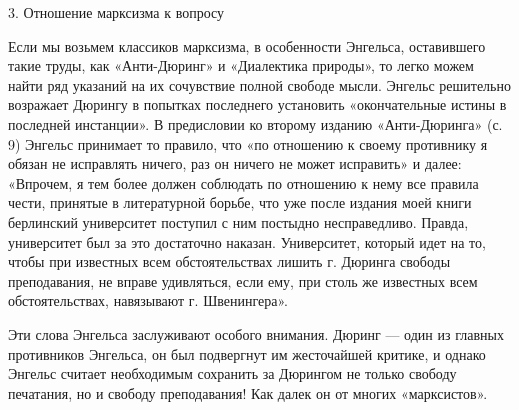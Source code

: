 3. Отношение марксизма к вопросу

Если  мы   возьмем  классиков   марксизма,  в   особенности  Энгельса,
оставившего такие труды, как  «Анти-Дюринг» и «Диалектика природы», то
легко можем найти ряд указаний  на их сочувствие полной свободе мысли.
Энгельс решительно возражает Дюрингу  в попытках последнего установить
«окончательные истины в последней инстанции». В предисловии ко второму
изданию «Анти-Дюринга»  (с. 9) Энгельс  принимает то правило,  что «по
отношению  к своему  противнику  я обязан  не  исправлять ничего,  раз
он  ничего  не  может  исправить»  и  далее:  «Впрочем,  я  тем  более
должен соблюдать  по отношению  к нему все  правила чести,  принятые в
литературной  борьбе,  что уже  после  издания  моей книги  берлинский
университет поступил с ним постыдно несправедливо. Правда, университет
был  за  это достаточно  наказан.  Университет,  который идет  на  то,
чтобы  при известных  всем обстоятельствах  лишить г.  Дюринга свободы
преподавания, не вправе  удивляться, если ему, при  столь же известных
всем обстоятельствах, навязывают г. Швенингера».

Эти  слова  Энгельса заслуживают  особого  внимания.  Дюринг ---  один
из  главных противников  Энгельса,  он был  подвергнут им  жесточайшей
критике, и однако Энгельс считает необходимым сохранить за Дюрингом не
только свободу печатания,  но и свободу преподавания! Как  далек он от
многих «марксистов».

